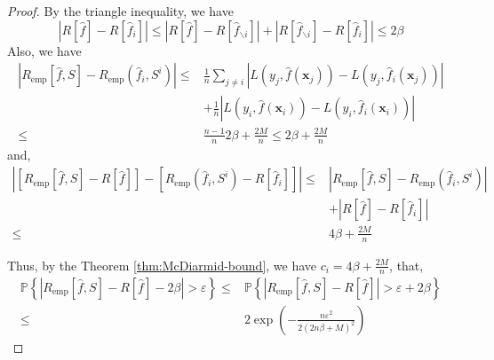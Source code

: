 \documentclass[a4paper, 12pt, mtpro2, authoryear]{elegantpaper}
\begin{document}
\begin{proof}
    By the triangle inequality, we have
    \begin{equation}
        \left|R[\hat{f}]-R[\hat{f}_{i}]\right|\leq\left|R[\hat{f}]-R[\hat{f}_{\backslash i}]\right|+\left|R[\hat{f}_{\backslash i}]-R[\hat{f}_{i}]\right|\leq 2\beta
    \end{equation}
    Also, we have
    \begin{equation}
        \begin{aligned}
            \left|R_{\text{emp}}[\hat{f},S]-R_{\text{emp}}\left(\hat{f}_{i},S^{i}\right)\right|\leq & \frac{1}{n}\sum_{j\neq i}\left|L\left(y_{j},\hat{f}(\mathbf{x}_{j})\right)-L\left(y_{j},\hat{f}_{i}(\mathbf{x}_{j})\right)\right| \\
                                                                                                    & +\frac{1}{n}\left|L\left(y_{i},\hat{f}(\mathbf{x}_{i})\right)-L\left(y_{i},\hat{f}_{i}(\mathbf{x}_{i})\right)\right|              \\
            \leq                                                                                    & \frac{n-1}{n}2\beta+\frac{2M}{n}\leq 2\beta+\frac{2M}{n}
        \end{aligned}
    \end{equation}
    and,
    \begin{equation}
        \begin{aligned}
            \left|\left[R_{\text{emp}}[\hat{f},S]-R[\hat{f}]\right]-\left[R_{\text{emp}}\left(\hat{f}_{i},S^{i}\right)-R[\hat{f}_{i}]\right]\right|\leq & \left|R_{\text{emp}}[\hat{f},S]-R_{\text{emp}}\left(\hat{f}_{i},S^{i}\right)\right| \\
                                                                                                                                                        & +\left|R[\hat{f}]-R[\hat{f}_{i}]\right|                                             \\
            \leq                                                                                                                                        & 4\beta+\frac{2M}{n}
        \end{aligned}
    \end{equation}

    Thus, by the Theorem \ref{thm:McDiarmid-bound}, we have $c_{i}=4\beta+\frac{2M}{n}$, that,
    \begin{equation}
        \begin{aligned}
            \mathbb{P}\left\{|R_{\text{emp}}[\hat{f},S]-R[\hat{f}]-2\beta|>\varepsilon\right\}\leq & \mathbb{P}\left\{|R_{\text{emp}}[\hat{f},S]-R[\hat{f}]|>\varepsilon+2\beta\right\} \\
            \leq                                                                                & 2\exp\left(-\frac{n\varepsilon^{2}}{2(2n\beta+M)^{2}}\right)
        \end{aligned}
    \end{equation}
\end{proof}
\end{document}
